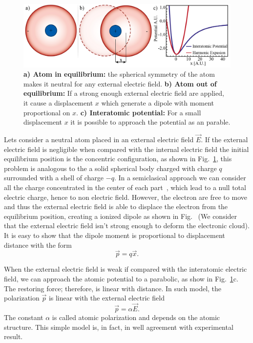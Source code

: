 \begin{figure}[h!]
    \centering
    \includegraphics[width = 16cm]{figuras/Dissertation_atomic_polarization.jpg}
    \caption{\textbf{a) Atom in equilibrium:} the spherical symmetry of the atom makes it neutral for any external electric field. \textbf{b) Atom out of equilibrium:} If a strong enough external electric field are applied, it cause a displacement $x$ which generate a dipole with moment proportional on $x$. \textbf{c) Interatomic potential:} For a small displacement $x$ it is possible to approach the potential as an parable.}
    \label{fig:polarization}
\end{figure}
Lets consider a neutral atom placed in an external electric field $\vec{E}$. If the external electric field is negligible when compared with the internal electric field the initial equilibrium position is the concentric configuration, as shown in Fig.~\ref{fig:polarization}, this problem is analogous to the a solid spherical body charged with charge $q$ surrounded with a shell of charge $-q$. In a semiclasical approach we can consider all the charge concentrated in the center of each part~\cite{Griffiths2005}, which lead to a null total electric charge, hence to non electric field. However, the electron are free to move and thus the external electric field is able to displace the electron from the equilibrium position, creating a ionized dipole as shown in Fig.~ (We consider that the external electric field isn't strong enough to deform the electronic cloud). It is easy to show that the dipole moment is proportional to displacement distance with the form~\cite{Griffiths2005}
\begin{equation}
    \vec{p} = q\vec{x}.
\end{equation}

When the external electric field is weak if compared with the interatomic electric field, we can approach the atomic potential to a parabolic, as show in Fig.~\ref{fig:polarization}c. The restoring force; therefore, is linear with distance. In such model, the polarization $\vec{p}$ is linear with the external electric field
\begin{equation}
    \vec{p} = \alpha \vec{E}.
\end{equation}
The constant $\alpha$ is called atomic polarization and depends on the atomic structure. This simple model is, in fact, in well agreement with experimental result.  

